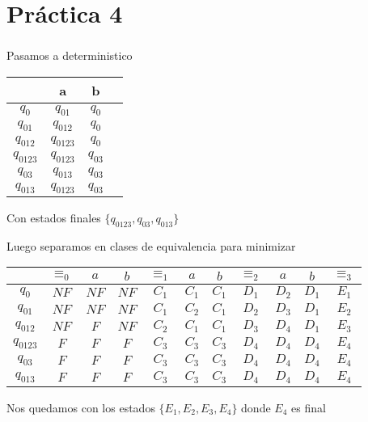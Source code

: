 \section{Práctica 4}
\subsubsection{}
Pasamos a deterministico

\begin{tabular}{c | c | c | c}
			& a 			& b  	\\
\hline
$q_0$ 		& $q_{01}$ 		& $q_0$ 	\\
$q_{01}$ 	& $q_{012}$		& $q_0$ 	\\
$q_{012}$ 	& $q_{0123}$ 	& $q_0$ 	\\
$q_{0123}$ 	& $q_{0123}$ 	& $q_{03}$ 	\\
$q_{03}$ 	& $q_{013}$ 	& $q_{03}$ 	\\
$q_{013}$ 	& $q_{0123}$ 	& $q_{03}$ 	\\
\end{tabular}

Con estados finales $\{q_{0123},q_{03},q_{013}\}$

Luego separamos en clases de equivalencia para minimizar

\begin{tabular}{| c || c | c | c || c | c | c || c | c | c || c |}
\hline
			& $\equiv_0$	& $a$	& $b$	& $\equiv_1$	& $a$	& $b$	& $\equiv_2$	& $a$	& $b$	& $\equiv_3$ \\
\hline			
$q_0$		& $NF$			& $NF$	& $NF$ 	& $C_1$			& $C_1$ & $C_1$ & $D_1$			& $D_2$ & $D_1$ & $E_1$ \\
\hline
$q_{01}$ 	& $NF$			& $NF$	& $NF$ 	& $C_1$ 		& $C_2$ & $C_1$ & $D_2$			& $D_3$ & $D_1$ & $E_2$ \\
\hline
$q_{012}$ 	& $NF$ 			& $F$	& $NF$ 	& $C_2$ 		& $C_1$ & $C_1$ & $D_3$			& $D_4$ & $D_1$ & $E_3$ \\
\hline
$q_{0123}$ 	& $F$ 			& $F$	& $F$ 	& $C_3$ 		& $C_3$ & $C_3$ & $D_4$			& $D_4$ & $D_4$ & $E_4$ \\
\hline
$q_{03}$ 	& $F$ 			& $F$	& $F$ 	& $C_3$ 		& $C_3$ & $C_3$ & $D_4$			& $D_4$ & $D_4$ & $E_4$ \\
\hline
$q_{013}$ 	& $F$ 			& $F$	& $F$ 	& $C_3$ 		& $C_3$ & $C_3$ & $D_4$			& $D_4$ & $D_4$ & $E_4$ \\
\hline
\end{tabular}

Nos quedamos con los estados $\{E_1,E_2,E_3,E_4\}$ donde $E_4$ es final